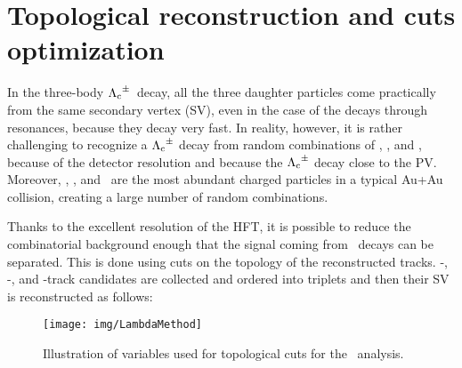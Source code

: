 \section{Topological reconstruction and cuts optimization}

In the three-body ${\Lambda_\text{c}}^\pm$\ decay, all the three daughter particles come practically from the same secondary vertex (SV), even in the case of the decays through resonances, because they decay very fast\@. In reality, however, it is rather challenging to recognize a ${\Lambda_\text{c}}^\pm$ decay from random combinations of \pipm, \Kmp, and \ppm, because of the detector resolution and because the ${\Lambda_\text{c}}^\pm$ decay close to the PV\@. Moreover, \pipm, \Kmp, and \ppm\ are the most abundant charged particles in a typical Au+Au collision, creating a large number of random combinations.

Thanks to the excellent resolution of the HFT, it is possible to reduce the combinatorial background enough that the signal coming from \Lambdac\ decays can be separated. This is done using cuts on the topology of the reconstructed tracks. \pipm-, \Kmp-, and \ppm-track candidates are collected and ordered into triplets and then their SV is reconstructed as follows:

\begin{figure}[!htb]
\centering
\texttt{[image: img/LambdaMethod]}
\caption[Illustration of variables used for topological cuts for the \Lambdac\ analysis.]{\label{fig:method}Illustration of variables used for topological cuts for the \Lambdac\ analysis.}
\end{figure}

